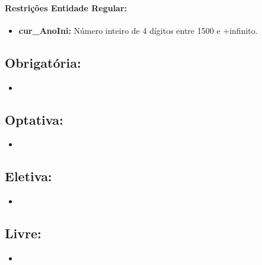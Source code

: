 \documentclass{report}
\begin{document}
\paragraph{Restrições Entidade Regular:}
\begin{itemize}
  \item \textbf{cur\_AnoIni:} Número inteiro de 4 dígitos entre 1500 e +infinito.
\end{itemize}

\subsection{Obrigatória:}	
\begin{itemize}
  \item 
\end{itemize}

\subsection{Optativa:}	
\begin{itemize}
  \item
\end{itemize}

\subsection{Eletiva:}
\begin{itemize}
  \item
\end{itemize}

\subsection{Livre:}
\begin{itemize}
  \item
\end{itemize}
\end{document}
